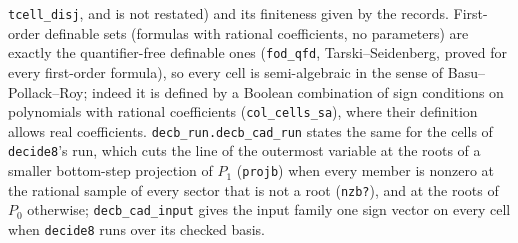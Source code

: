 \documentclass[11pt]{article}
\newcommand\code[1]{\mbox{\texttt{#1}}}
\begin{document}
\code{tcell\_disj}, and is not restated) and its finiteness given by the records. First-order definable sets
(formulas with rational coefficients, no parameters) are exactly the quantifier-free definable ones
(\code{fod\_qfd}, Tarski--Seidenberg, proved for every first-order formula), so every cell is semi-algebraic in
the sense of Basu--Pollack--Roy; indeed it is defined by a Boolean combination of sign conditions on polynomials
with rational coefficients (\code{col\_cells\_sa}), where their definition allows real coefficients.
\code{decb\_run.decb\_cad\_run} states the same for the cells of \texttt{decide8}'s run, which cuts the line of
the outermost variable at the roots of a smaller bottom-step projection of $P_1$ (\code{projb}) when every member
is nonzero at the rational sample of every sector that is not a root (\code{nzb?}), and at the roots of $P_0$
otherwise; \code{decb\_cad\_input} gives the input family one sign vector on every cell when \texttt{decide8} runs
over its checked basis.
\end{document}
